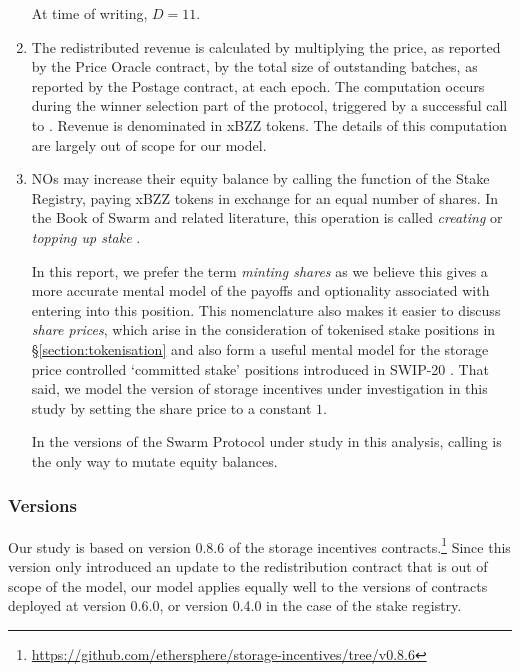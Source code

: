 \begin{enumerate}
    At time of writing, $D=11$.

  \item 
    The redistributed revenue is calculated by multiplying the price, as reported by the Price Oracle contract, by the total size of outstanding batches, as reported by the Postage contract, at each epoch.
    The computation occurs during the winner selection part of the protocol, triggered by a successful call to .
    Revenue is denominated in xBZZ tokens.
    The details of this computation are largely out of scope for our model.
  
  \item 
    NOs may increase their equity balance by calling the  function of the Stake Registry, paying xBZZ tokens in exchange for an equal number of shares.
    In the Book of Swarm and related literature, this operation is called \emph{creating} or \emph{topping up stake} \cite[\S3.4.3]{book-of-swarm}.
    
    In this report, we prefer the term \emph{minting shares} as we believe this gives a more accurate mental model of the payoffs and optionality associated with entering into this position.
    This nomenclature also makes it easier to discuss \emph{share prices}, which arise in the consideration of tokenised stake positions in \S\ref{section:tokenisation} and also form a useful mental model for the storage price controlled `committed stake' positions introduced in SWIP-20 \cite{swip-20}.
    That said, we model the version of storage incentives under investigation in this study by setting the share price to a constant $1$.

    In the versions of the Swarm Protocol under study in this analysis, calling  is the only way to mutate equity balances.

\end{enumerate}

\subsubsection{Versions}
\label{section:versions}

Our study is based on version 0.8.6 of the storage incentives contracts.\footnote{\url{https://github.com/ethersphere/storage-incentives/tree/v0.8.6}}
%
Since this version only introduced an update to the redistribution contract that is out of scope of the model, our model applies equally well to the versions of contracts deployed at version 0.6.0, or version 0.4.0 in the case of the stake registry.



